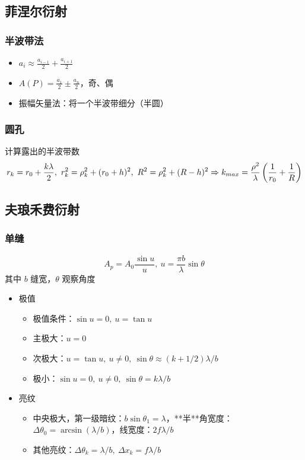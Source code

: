 \documentclass{article}
\begin{document}
\subsection{菲涅尔衍射}

\subsubsection{半波带法}

\begin{itemize}
    \item $a_i\approx\frac{a_{i-1}}{2}+\frac{a_{i+1}}{2}$
    \item $A(P)=\frac{a_1}{2}\pm\frac{a_n}{2}$，奇、偶
    \item 振幅矢量法：将一个半波带细分（半圆）
\end{itemize}

\subsubsection{圆孔}

计算露出的半波带数 $$
    r_k=r_0+\frac{k\lambda}{2},\ r_k^2=\rho_k^2+(r_0+h)^2,\ R^2=\rho_k^2+(R-h)^2\\\Rightarrow k_{max}=\frac{\rho^2}{\lambda}\left(\frac{1}{r_0}+\frac{1}{R}\right)
$$

\subsection{夫琅禾费衍射}

\subsubsection{单缝}

$$
    A_p=A_0\frac{\sin u}{u},\ u=\frac{\pi b}{\lambda}\sin\theta
$$
其中 $b$ 缝宽，$\theta$ 观察角度
\begin{itemize}
    \item 极值 \begin{itemize}
              \item 极值条件：$\sin u=0,\ u=\tan u$
              \item 主极大：$u=0$
              \item 次极大：$u=\tan u,\ u\neq 0,\ \sin\theta\approx(k+1/2)\lambda/b$
              \item 极小：$\sin u=0,\ u\neq 0,\ \sin\theta=k\lambda/b$
          \end{itemize}
    \item 亮纹 \begin{itemize}
              \item 中央极大，第一级暗纹：$b\sin\theta_1=\lambda$，**半**角宽度：$\Delta\theta_0=\arcsin(\lambda/b)$，线宽度：$2f\lambda/b$
              \item 其他亮纹：$\Delta\theta_k=\lambda/b,\ \Delta x_k=f\lambda/b$
          \end{itemize}
\end{itemize}
\end{document}
